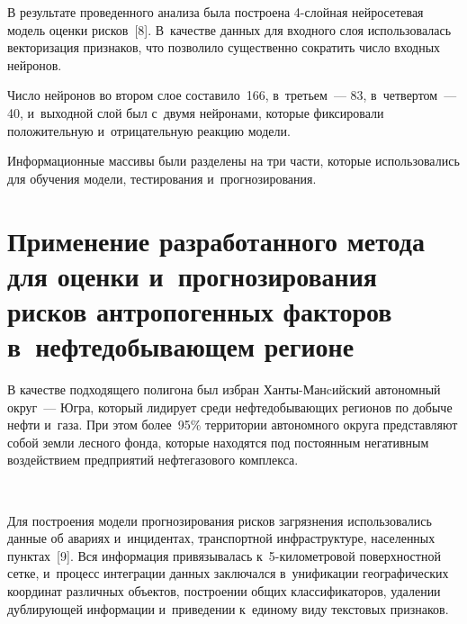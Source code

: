 \begin{multicols}{2}
\vspace*{-4pt}

  В результате проведенного анализа была по\-строена 4-слой\-ная нейросетевая 
модель оценки рисков~[8]. В~качестве данных для входного слоя 
использовалась векторизация признаков, что позволило существенно сократить 
число входных нейронов.
  
  Число нейронов во втором слое составило~166, в~третьем~--- 83, в~четвертом~--- 40, 
и~выходной слой был с~двумя нейронами, которые фиксировали 
положительную и~отрицательную реакцию модели.
  
  Информационные массивы были разделены на три части, которые 
использовались для обучения модели, тестирования и~прогнозирования.
  
\section{Применение разработанного метода для оценки 
и~прогнозирования рисков антропогенных факторов 
в~нефтедобывающем регионе}

\vspace*{-14pt}

  В качестве подходящего полигона был избран Хан\-ты-Ман\-cий\-ский 
автономный округ~--- Югра, который лидирует среди нефтедобывающих 
регионов по добыче нефти и~газа. При этом более~95\% территории 
автономного округа представляют собой земли лесного фонда, которые 
находятся под постоянным негативным воздействием предприятий 
нефтегазового комплекса. 

\begin{figure*} %
\vspace*{1pt}
    \begin{center}  
  \mbox{%
 \epsfxsize=163mm 
 }
\end{center}
\vspace*{-9pt}
\end{figure*}




  
  Для построения модели прогнозирования рисков загрязнения 
использовались данные об авариях и~инцидентах, транспортной 
инфраструктуре, населенных пунктах~[9]. Вся информация привязывалась  
к~5-ки\-ло\-мет\-ро\-вой поверхностной сетке, и~процесс интеграции данных 
заключался в~унификации географических координат различных объектов, 
построении общих классификаторов, удалении дублирующей информации 
и~приведении к~единому виду текстовых признаков.
  

\end{multicols}
